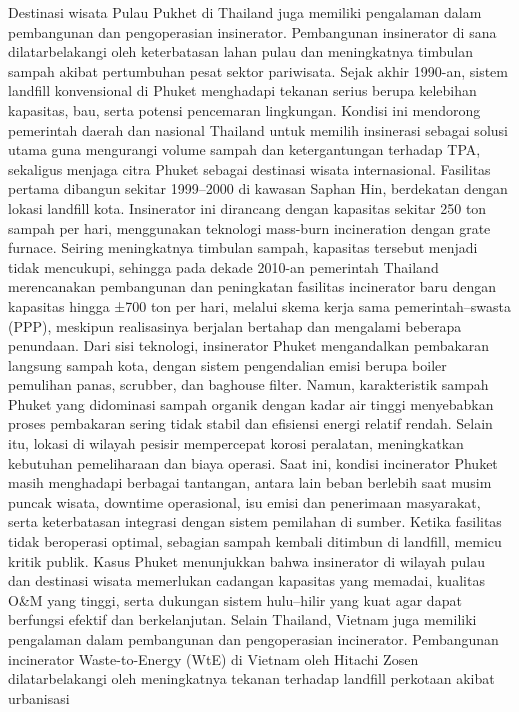 \documentclass[
  letterpaper,
  DIV=11,
  numbers=noendperiod]{scrreprt}
\begin{document}
Destinasi wisata Pulau Pukhet di Thailand juga memiliki pengalaman dalam
pembangunan dan pengoperasian insinerator. Pembangunan insinerator di
sana dilatarbelakangi oleh keterbatasan lahan pulau dan meningkatnya
timbulan sampah akibat pertumbuhan pesat sektor pariwisata. Sejak akhir
1990-an, sistem landfill konvensional di Phuket menghadapi tekanan
serius berupa kelebihan kapasitas, bau, serta potensi pencemaran
lingkungan. Kondisi ini mendorong pemerintah daerah dan nasional
Thailand untuk memilih insinerasi sebagai solusi utama guna mengurangi
volume sampah dan ketergantungan terhadap TPA, sekaligus menjaga citra
Phuket sebagai destinasi wisata internasional. Fasilitas pertama
dibangun sekitar 1999--2000 di kawasan Saphan Hin, berdekatan dengan
lokasi landfill kota. Insinerator ini dirancang dengan kapasitas sekitar
250 ton sampah per hari, menggunakan teknologi mass-burn incineration
dengan grate furnace. Seiring meningkatnya timbulan sampah, kapasitas
tersebut menjadi tidak mencukupi, sehingga pada dekade 2010-an
pemerintah Thailand merencanakan pembangunan dan peningkatan fasilitas
incinerator baru dengan kapasitas hingga ±700 ton per hari, melalui
skema kerja sama pemerintah--swasta (PPP), meskipun realisasinya
berjalan bertahap dan mengalami beberapa penundaan. Dari sisi teknologi,
insinerator Phuket mengandalkan pembakaran langsung sampah kota, dengan
sistem pengendalian emisi berupa boiler pemulihan panas, scrubber, dan
baghouse filter. Namun, karakteristik sampah Phuket yang didominasi
sampah organik dengan kadar air tinggi menyebabkan proses pembakaran
sering tidak stabil dan efisiensi energi relatif rendah. Selain itu,
lokasi di wilayah pesisir mempercepat korosi peralatan, meningkatkan
kebutuhan pemeliharaan dan biaya operasi. Saat ini, kondisi incinerator
Phuket masih menghadapi berbagai tantangan, antara lain beban berlebih
saat musim puncak wisata, downtime operasional, isu emisi dan penerimaan
masyarakat, serta keterbatasan integrasi dengan sistem pemilahan di
sumber. Ketika fasilitas tidak beroperasi optimal, sebagian sampah
kembali ditimbun di landfill, memicu kritik publik. Kasus Phuket
menunjukkan bahwa insinerator di wilayah pulau dan destinasi wisata
memerlukan cadangan kapasitas yang memadai, kualitas O\&M yang tinggi,
serta dukungan sistem hulu--hilir yang kuat agar dapat berfungsi efektif
dan berkelanjutan. Selain Thailand, Vietnam juga memiliki pengalaman
dalam pembangunan dan pengoperasian incinerator. Pembangunan incinerator
Waste-to-Energy (WtE) di Vietnam oleh Hitachi Zosen dilatarbelakangi
oleh meningkatnya tekanan terhadap landfill perkotaan akibat urbanisasi
\end{document}
